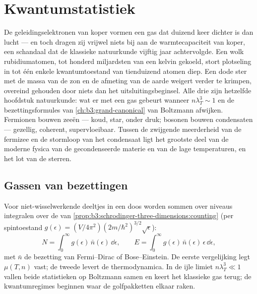 \chapter{Kwantumstatistiek}\label{ch:b3:quantum-statistics}

De geleidingselektronen van koper vormen een gas dat duizend keer dichter
is dan lucht --- en toch dragen zij vrijwel niets bij aan de
warmtecapaciteit van koper, een schandaal dat de klassieke natuurkunde
vijftig jaar achtervolgde. Een wolk rubidiumatomen, tot honderd
miljardsten van een kelvin gekoeld, stort plotseling in tot één enkele
kwantumtoestand van tienduizend atomen diep. Een dode ster met de massa
van de zon en de afmeting van de aarde weigert verder te krimpen,
overeind gehouden door niets dan het uitsluitingsbeginsel. Alle drie zijn
hetzelfde hoofdstuk natuurkunde: wat er met een gas gebeurt wanneer
$n\lambda_T^3 \sim 1$ en de bezettingsformules van
\cref{ch:b3:grand-canonical} van Boltzmann afwijken. Fermionen bouwen
zeeën --- koud, star, onder druk; bosonen bouwen condensaten ---
gezellig, coherent, supervloeibaar. Tussen de zwijgende meerderheid van de
fermizee en de stormloop van het condensaat ligt het grootste deel van de
moderne fysica van de gecondenseerde materie en van de lage temperaturen,
en het lot van de sterren.

\section{Gassen van bezettingen}

\begin{proposition}\label{prop:b3:quantum-statistics:machinery}
Voor niet-wisselwerkende deeltjes in een doos worden sommen over niveaus
integralen over de  van
\cref{prop:b3:schrodinger-three-dimensions:counting} (per spintoestand
$g(\epsilon) = (V/4\pi^2)(2m/\hbar^2)^{3/2}\sqrt\epsilon$):
\[
N = \int_0^\infty g(\epsilon)\,\bar n(\epsilon)\,\dd\epsilon ,
\qquad
E = \int_0^\infty g(\epsilon)\,\bar n(\epsilon)\,\epsilon\,
\dd\epsilon ,
\]
met $\bar n$ de bezetting van Fermi--Dirac of Bose--Einstein. De eerste
vergelijking legt $\mu(T, n)$ vast; de tweede levert de thermodynamica. In
de ijle limiet $n\lambda_T^3 \ll 1$ vallen beide statistieken op Boltzmann
samen en keert het klassieke gas terug; de kwantumregimes beginnen waar de
golfpakketten elkaar raken.
\end{proposition}
\admitted

